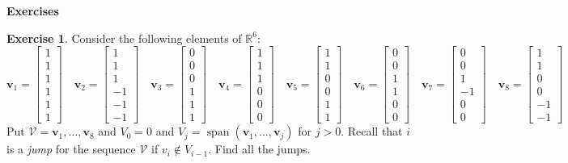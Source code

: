 \documentclass{amsart}
\newcommand{\R}         {{\mathbb{R}}}
\newcommand{\spn}       {\operatorname{span}}
\newcommand{\bsm}       {\left[\begin{smallmatrix}}
\newcommand{\esm}       {\end{smallmatrix}\right]}
\newcommand{\vv}        {\mathbf{v}}
\newcommand{\CV}        {{\mathcal{V}}}
\renewcommand{\:}       {\colon}
\theoremstyle{definition}
\newtheorem{exercise}{Exercise}[section]
\begin{document}
\begin{center}
 \Large \textbf{Exercises}
\end{center}

\begin{exercise}
 Consider the following elements of $\R^6$:
 {\tiny \[
  \vv_1=\bsm 1\\1\\1\\1\\1\\1\esm \hspace{1em}
  \vv_2=\bsm 1\\1\\1\\-1\\-1\\-1\esm \hspace{1em}
  \vv_3=\bsm 0\\0\\0\\1\\1\\1\esm \hspace{1em}
  \vv_4=\bsm 1\\1\\1\\0\\0\\0\esm \hspace{1em}
  \vv_5=\bsm 1\\1\\0\\0\\1\\1\esm \hspace{1em}
  \vv_6=\bsm 0\\0\\1\\1\\0\\0\esm \hspace{1em}
  \vv_7=\bsm 0\\0\\1\\-1\\0\\0\esm \hspace{1em}
  \vv_8=\bsm 1\\1\\0\\0\\-1\\-1\esm \hspace{1em}
 \]}
 Put $\CV=\vv_1,\dotsc,\vv_8$ and $V_0=0$ and 
 $V_j=\spn(\vv_1,\dotsc,\vv_j)$ for $j>0$.
 Recall that $i$ is a \emph{jump} for the sequence $\CV$ if
 $v_i\not\in V_{i-1}$.  Find all the jumps.
\end{exercise}
\end{document}
